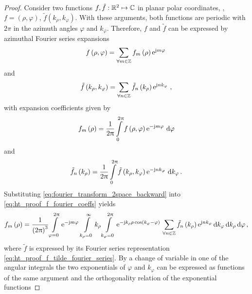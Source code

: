 \begin{proof}
	Consider two functions $f,\tilde{f}: \mathbb{R}^2 \mapsto \mathbb{C}$ in planar polar
	coordinates, \ie, $f = \left(\rho, \varphi\right)$,
	$\tilde{f} \left(k_\rho, k_\varphi\right)$.
	With these arguments, both functions are periodic with $2\pi$ in the
	azimuth angles $\varphi$ and $k_\varphi$.
	Therefore, $f$ and $\tilde{f}$ can be expressed by azimuthal Fourier series
	expansions
	\begin{equation}\label{eq:ht_proof_f_fourier_series}
		f \left(\rho,\varphi\right) =
		\sum_{\forall m \in \mathbb{Z}}
		f_m \left(\rho\right)
		\mathrm{e}^{\mathrm{j} m \varphi}\,
	\end{equation}
	and
	\begin{equation}\label{eq:ht_proof_f_tilde_fourier_series}
		\tilde{f} \left(k_\rho, k_\varphi\right) = 
		\sum_{\forall n \in \mathbb{Z}}
		\tilde{f}_n \left(k_\rho\right)
		\mathrm{e}^{\mathrm{j} n k_\varphi}\,
		\, ,
	\end{equation}
	with expansion coefficients given by
	\begin{equation}\label{eq:ht_proof_f_fourier_coeffs}
		f_m\left(\rho\right) = \frac{1}{2\uppi}
		\int\limits_{0}^{2\uppi} 
		f \left(\rho, \varphi\right)
		\mathrm{e}^{-\mathrm{j} m \varphi}\, \,
		\mathrm{d} \varphi
	\end{equation}
	and
	\begin{equation}\label{eq:ht_proof_f_tilde_fourier_coeffs}
		\tilde{f}_n \left(k_\rho\right) = \frac{1}{2\uppi}
		\int\limits_{0}^{2\uppi} 
		\tilde{f} \left(k_\rho, k_\varphi\right)
		\mathrm{e}^{-\mathrm{j} n k_\varphi}\, \,
		\mathrm{d} k_\varphi
		\, .
	\end{equation}
	Substituting \eqref{eq:fourier_transform_2space_backward} into
	\eqref{eq:ht_proof_f_fourier_coeffs} yields 
	\begin{equation}\label{eq:ht_proof_triple_integral}
		f_m \left(\rho\right)  =
		\frac{1}{\left(2\uppi\right)^3}
		\int\limits_{\varphi = 0}^{2\uppi} 
		\mathrm{e}^{-\mathrm{j} m \varphi}\,
		\int\limits_{k_\rho = 0}^{\infty}
		k_\rho
		\int\limits_{k_\varphi = 0}^{2\uppi} 
		\mathrm{e}^{-\mathrm{j} k_\rho \rho \cos \left(k_\varphi - \varphi\right)}\,
		\sum_{\forall n \in \mathbb{Z}}
		\tilde{f}_n \left(k_\rho\right)
		\mathrm{e}^{\mathrm{j} n k_\varphi}\,
		\mathrm{d} k_\varphi \,
		\mathrm{d} k_\rho \,
		\mathrm{d} \varphi
		\, ,
	\end{equation}
	where $\tilde{f}$ is expressed by its Fourier series representation
	\eqref{eq:ht_proof_f_tilde_fourier_series}.
	By a change of variable in one of the angular integrals the two exponentials
	of $\varphi$ and $k_\varphi$ can be expressed as functions of the same
	argument and the orthogonality relation of the exponential functions

\end{proof}

